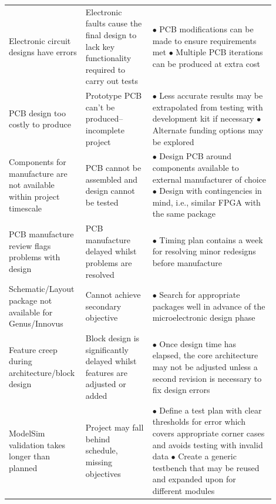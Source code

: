 \documentclass{article}
\begin{document}
\begin{longtable}{R{0.22\linewidth} R{0.24\linewidth} R{0.44\linewidth}}
        Electronic circuit designs have errors & Electronic faults cause the final design to lack key functionality required to carry out tests & $\bullet$ PCB modifications can be made to ensure requirements met \linebreak$\bullet$ Multiple PCB iterations can be produced at extra cost \vspace{5pt} \\

          PCB design too costly to produce & Prototype PCB can't be produced--incomplete project & $\bullet$ Less accurate results may be extrapolated from testing with development kit if necessary \linebreak$\bullet$ Alternate funding options may be explored \vspace{5pt} \\

         Components for manufacture are not available within project timescale & PCB cannot be assembled and design cannot be tested & $\bullet$ Design PCB around components available to external manufacturer of choice \linebreak$\bullet$ Design with contingencies in mind, i.e., similar FPGA with the same package \vspace{5pt} \\

          PCB manufacture review flags problems with design & PCB manufacture delayed whilst problems are resolved & $\bullet$ Timing plan contains a week for resolving minor redesigns before manufacture \vspace{5pt} \\

         Schematic/Layout package not available for Genus/Innovus & Cannot achieve secondary objective & $\bullet$ Search for appropriate packages well in advance of the microelectronic design phase \vspace{5pt} \\

          Feature creep during architecture/block design & Block design is significantly delayed whilst features are adjusted or added & $\bullet$ Once design time has elapsed, the core architecture may not be adjusted unless a second revision is necessary to fix design errors \vspace{5pt} \\
         
          ModelSim validation takes longer than planned & Project may fall behind schedule, missing objectives & $\bullet$ Define a test plan with clear thresholds for error which covers appropriate corner cases and avoids testing with invalid data \linebreak$\bullet$ Create a generic testbench that may be reused and expanded upon for different modules \vspace{5pt} \\


\end{longtable}
\end{document}
